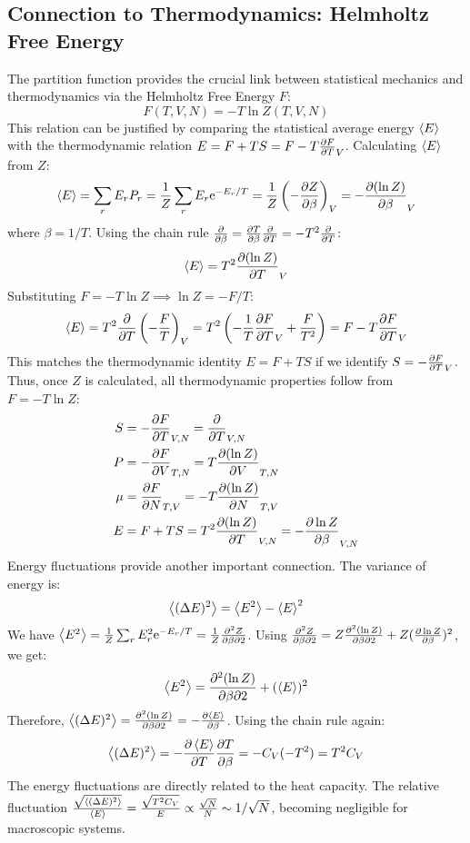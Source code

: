 \documentclass[10pt, letterpaper]{article}
\newcommand{\avg}[1]{\expval{#1}} %
\newcommand{\mathe}{\mathrm{e}} %
\begin{document}
\subsection{Connection to Thermodynamics: Helmholtz Free Energy}
The partition function provides the crucial link between statistical mechanics and thermodynamics via the Helmholtz Free Energy $F$:
\begin{equation}
    \boxed{F(T, V, N) = -T \ln Z(T, V, N)}
\end{equation}
This relation can be justified by comparing the statistical average energy $\avg{E}$ with the thermodynamic relation $E = F + TS = F - T\pdv{F}{T}_V$.
Calculating $\avg{E}$ from $Z$:
\begin{equation*}
 \avg{E} = \sum_r E_r P_r = \frac{1}{Z} \sum_r E_r \mathe^{-E_r / T} = \frac{1}{Z} \left( -\pdv{Z}{\beta} \right)_V = -\pdv{(\ln Z)}{\beta}_V
\end{equation*}
where $\beta = 1/T$. Using the chain rule $\pdv{}{\beta} = \pdv{T}{\beta} \pdv{}{T} = -T^2 \pdv{}{T}$:
\begin{equation} \label{eq:avgE_from_Z}
 \avg{E} = T^2 \pdv{(\ln Z)}{T}_V
\end{equation}
Substituting $F = -T \ln Z \implies \ln Z = -F/T$:
\begin{equation*}
 \avg{E} = T^2 \pdv{}{T} \left( -\frac{F}{T} \right)_V = T^2 \left( -\frac{1}{T}\pdv{F}{T}_V + \frac{F}{T^2} \right) = F - T \pdv{F}{T}_V
\end{equation*}
This matches the thermodynamic identity $E = F + TS$ if we identify $S = -\pdv{F}{T}_V$.
Thus, once $Z$ is calculated, all thermodynamic properties follow from $F = -T \ln Z$:
\begin{align}
    S &= -\pdv{F}{T}_{V,N} = \pdv{}{T}(T \ln Z)_{V,N} \\
    P &= -\pdv{F}{V}_{T,N} = T \pdv{(\ln Z)}{V}_{T,N} \\
    \mu &= \pdv{F}{N}_{T,V} = -T \pdv{(\ln Z)}{N}_{T,V} \\
    E &= F+TS = T^2 \pdv{(\ln Z)}{T}_{V,N} = -\pdv{\ln Z}{\beta}_{V,N}
\end{align}
Energy fluctuations provide another important connection. The variance of energy is:
\begin{equation*}
    \avg{(\Delta E)^2} = \avg{E^2} - \avg{E}^2
\end{equation*}
We have $\avg{E^2} = \frac{1}{Z} \sum_r E_r^2 \mathe^{-E_r / T} = \frac{1}{Z} \pdv[2]{Z}{\beta}{2}$. Using $\pdv[2]{Z}{\beta}{2} = Z \pdv[2]{(\ln Z)}{\beta}{2} + Z (\pdv{\ln Z}{\beta})^2$, we get:
\begin{equation*}
    \avg{E^2} = \pdv[2]{(\ln Z)}{\beta}{2} + (\avg{E})^2
\end{equation*}
Therefore, $\avg{(\Delta E)^2} = \pdv[2]{(\ln Z)}{\beta}{2} = -\pdv{\avg{E}}{\beta}$. Using the chain rule again:
\begin{equation}
    \avg{(\Delta E)^2} = -\pdv{\avg{E}}{T} \pdv{T}{\beta} = -C_V (-T^2) = T^2 C_V
\end{equation}
The energy fluctuations are directly related to the heat capacity. The relative fluctuation $\frac{\sqrt{\avg{(\Delta E)^2}}}{\avg{E}} = \frac{\sqrt{T^2 C_V}}{E} \propto \frac{\sqrt{N}}{N} \sim 1/\sqrt{N}$, becoming negligible for macroscopic systems.
\end{document}
